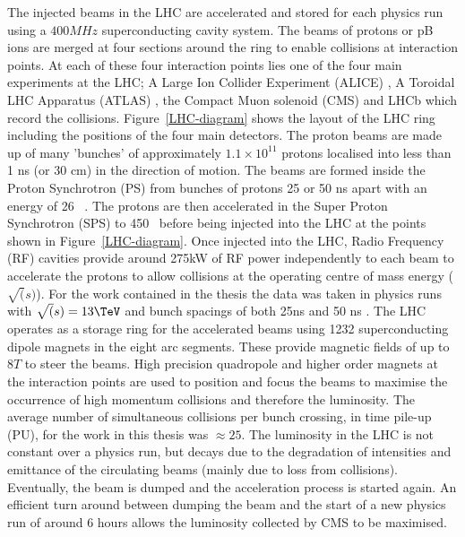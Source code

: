 The injected beams in the LHC are accelerated and stored for each physics run using 
a $400MHz$ superconducting cavity system. The beams of protons or pB ions 
are merged at four sections around the ring to enable collisions at interaction points.
At each of these four interaction points lies one of the four main 
experiments at the LHC; A Large Ion Collider Experiment (ALICE) \cite{ALICE},
A Toroidal LHC Apparatus (ATLAS) \cite{ATLAS}, the Compact Muon solenoid (CMS) \cite{CMS}
and LHCb which record the collisions. Figure~\ref{LHC-diagram} shows the layout of the LHC ring including
the positions of the four main detectors. The proton beams are made up of many 'bunches' of approximately $1.1\times10^{11}$
protons localised into less than 1 ns (or 30 cm) in the direction of motion.
The beams are formed inside the Proton Synchrotron (PS) from bunches of protons 25 or 50 ns apart with an energy of 26 \GeV~. 
The protons are then accelerated in the Super Proton Synchrotron (SPS) to 450 \GeV~before being injected into the LHC at
the points shown in Figure~\ref{LHC-diagram}. Once injected into the LHC, Radio Frequency (RF) cavities 
provide around 275kW of RF power independently to each beam to accelerate the protons to allow collisions
at the operating centre of mass energy ($\sqrt(s)$). For the work contained in the thesis 
the data was taken in physics runs with $\sqrt(s) = 13\TeV$ and bunch spacings of both 25ns and 50 ns \cite{LHC}. 
The LHC operates as a storage ring for the accelerated beams using 1232 
superconducting dipole magnets in the eight arc segments. These provide magnetic fields of up to $8T$ to steer the beams. 
High precision quadropole and higher order magnets at the interaction points are used to position and focus the beams to 
maximise the occurrence of high momentum collisions and therefore the luminosity. The average number of simultaneous collisions
per bunch crossing, in time pile-up (PU), for the work in this thesis was $\approx25$.
The luminosity in the LHC is not constant over a physics run, but decays due to the degradation 
of intensities and emittance of the circulating beams (mainly due to loss from collisions). Eventually,
the beam is dumped and the acceleration process is started again. An efficient turn around between
dumping the beam and the start of a new physics run of 
around 6 hours allows the luminosity collected by CMS to be maximised. 

